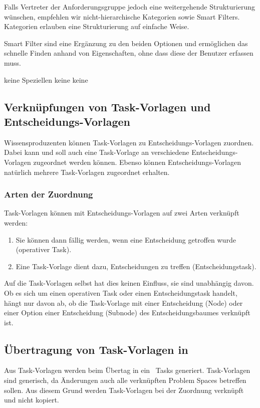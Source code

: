 {{				Falls Vertreter der Anforderungsgruppe jedoch eine weitergehende Strukturierung wünschen, 
				empfehlen wir nicht-hierarchische Kategorien sowie Smart Filters.
				Kategorien erlauben eine Strukturierung auf einfache Weise. 

				Smart Filter sind eine Ergänzung zu den beiden Optionen und ermöglichen das schnelle Finden anhand von Eigenschaften,
				ohne dass diese der Benutzer erfassen muss.
			}
			{keine Speziellen}
			{keine}
			{keine}
		}
		
		
		\subsection{Verknüpfungen von Task-Vorlagen und Entscheidungs-Vorlagen}
			Wissensproduzenten können Task-Vorlagen zu Entscheidungs-Vorlagen zuordnen.
			Dabei kann und soll auch eine Task-Vorlage an verschiedene Entscheidungs-Vorlagen zugeordnet werden können.
			Ebenso können Entscheidungs-Vorlagen natürlich mehrere Task-Vorlagen zugeordnet erhalten.
			
			\subsubsection{Arten der Zuordnung}
				Task-Vorlagen können mit Entscheidungs-Vorlagen auf zwei Arten verknüpft werden:
				\begin{enumerate}
					\item Sie können dann fällig werden, wenn eine Entscheidung getroffen wurde (operativer Task).
					\item Eine Task-Vorlage dient dazu, Entscheidungen zu treffen (Entscheidungstask).
				\end{enumerate}
				Auf die Task-Vorlagen selbst hat dies keinen Einfluss, sie sind unabhängig davon. 
				Ob es sich um einen operativen Task oder einen Entscheidungstask handelt, hängt nur davon ab,
				ob die Task-Vorlage mit einer Entscheidung (Node) oder einer Option einer Entscheidung (Subnode) des Entscheidungsbaumes verknüpft ist.

			\subsection{Übertragung von Task-Vorlagen in \ppt}
				Aus Task-Vorlagen werden beim Übertag in ein \ppt\ Tasks generiert.
				Task-Vorlagen sind generisch, da Änderungen auch alle verknüpften Problem Spaces betreffen sollen.
				Aus diesem Grund werden Task-Vorlagen bei der Zuordnung verknüpft und nicht kopiert.
				
